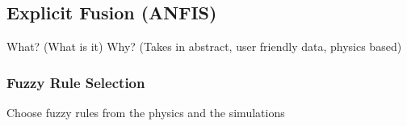 





\subsection{Explicit Fusion (ANFIS)}
What? (What is it)
Why? (Takes in abstract, user friendly data, physics based)

\subsubsection{Fuzzy Rule Selection}
Choose fuzzy rules from the physics and the simulations

